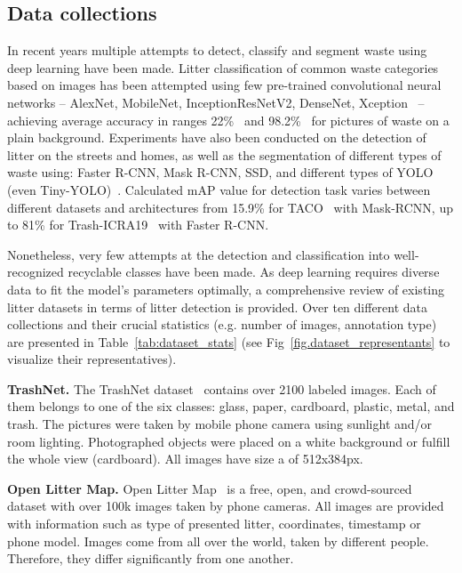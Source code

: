 \documentclass{article}
\begin{document}
\subsection{Data collections}
\label{sec:litter_datasets}
In recent years multiple attempts to detect, classify and segment waste using deep learning have been made. Litter classification of common waste categories based on images has been attempted using few pre-trained convolutional neural networks -- AlexNet, MobileNet, InceptionResNetV2, DenseNet, Xception~\cite{TrashNet2016, Bircanoglu18, Chu2018} -- achieving average accuracy in ranges 22\%~\cite{TrashNet2016} and 98.2\%~\cite{Chu2018} for pictures of waste on a plain background. Experiments have also been conducted on the detection of litter on the streets and homes, as well as the segmentation of different types of waste using: Faster R-CNN, Mask R-CNN, SSD, and different types of YOLO (even Tiny-YOLO)~\cite{Awe2017trashnet, Liu2018, ICRA2019, hong2020trashcan, proencca2020taco, YOLO-TrashNet2020, MJU-Waste2020, UAVVaste2021}. Calculated mAP value for detection task varies between different datasets and architectures from 15.9\% for TACO~\cite{proencca2020taco} with Mask-RCNN, up to 81\% for Trash-ICRA19~\cite{ICRA2019} with Faster R-CNN.

Nonetheless, very few attempts at the detection and classification into well-recognized recyclable classes have been made. As deep learning requires diverse data to fit the model's parameters optimally, a comprehensive review of existing litter datasets in terms of litter detection is provided. Over ten different data collections and their crucial statistics (e.g. number of images, annotation type) are presented in Table~\ref{tab:dataset_stats} (see Fig~\ref{fig.dataset_representants} to visualize their representatives).

\textbf{TrashNet.} The TrashNet dataset~\cite{TrashNet2016} contains over 2100 labeled images. Each of them belongs to one of the six classes: glass, paper, cardboard, plastic, metal, and trash. The pictures were taken by mobile phone camera using sunlight and/or room lighting. Photographed objects were placed on a white background or fulfill the whole view (cardboard). All images have size a of 512x384px.

\textbf{Open Litter Map.} Open Litter Map~\cite{openlittermap2018} is a free, open, and crowd-sourced dataset with over 100k images taken by phone cameras. All images are provided with information such as type of presented litter, coordinates, timestamp or phone model. Images come from all over the world, taken by different people. Therefore, they differ significantly from one another.
\end{document}
